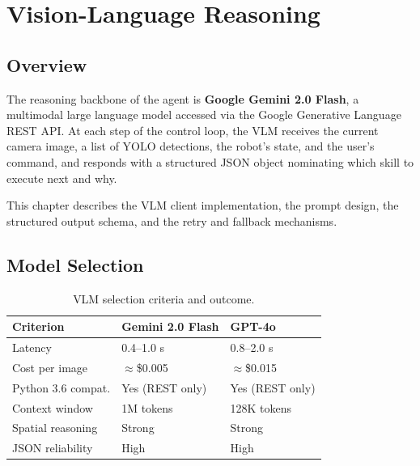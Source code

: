 \chapter{Vision-Language Reasoning}
\label{ch:vlm}

\section{Overview}

The reasoning backbone of the agent is \textbf{Google Gemini 2.0 Flash}, a multimodal
large language model accessed via the Google Generative Language REST API.
At each step of the control loop, the VLM receives the current camera image, a list
of YOLO detections, the robot's state, and the user's command, and responds with
a structured JSON object nominating which skill to execute next and why.

This chapter describes the VLM client implementation, the prompt design, the
structured output schema, and the retry and fallback mechanisms.

\section{Model Selection}

\begin{table}[H]
\centering
\caption{VLM selection criteria and outcome.}
\label{tab:vlm_select}
\begin{tabularx}{\linewidth}{lXX}
\toprule
\textbf{Criterion} & \textbf{Gemini 2.0 Flash} & \textbf{GPT-4o} \\
\midrule
Latency            & 0.4--1.0 s                & 0.8--2.0 s \\
Cost per image     & $\approx$\$0.005          & $\approx$\$0.015 \\
Python 3.6 compat. & Yes (REST only)            & Yes (REST only) \\
Context window     & 1M tokens                  & 128K tokens \\
Spatial reasoning  & Strong                     & Strong \\
JSON reliability   & High                       & High \\
\bottomrule
\end{tabularx}
\end{table}

